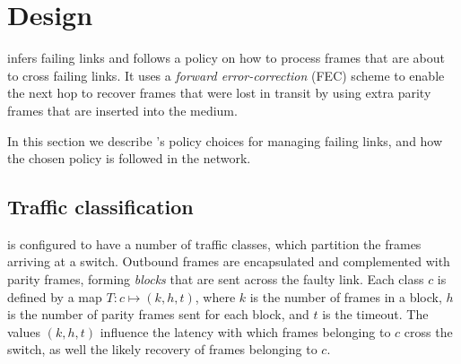 \section{Design}
\label{sec:design}

\OurSys infers failing links and follows a policy on how to process
frames that are about to cross failing links. It uses a \emph{forward
error-correction} (FEC) scheme to enable the next hop to recover frames that
were lost in transit by using extra parity frames that are inserted
into the medium.

In this section we describe \OurSys's policy choices for managing failing
links, and how the chosen policy is followed in the network.


\subsection{Traffic classification}
\label{sec:traffic-classification}
\OurSys is configured to have a number of traffic classes,
which partition%
 the frames arriving at a switch. Outbound frames are encapsulated and
complemented with parity frames, forming \emph{blocks} that are sent across
the faulty link.
Each class $c$ is defined by a map $T: c \mapsto (k, h, t)$, where $k$ is the
number of frames in a block, $h$ is the number of parity frames sent for each
block, and $t$ is the timeout.
The values $(k, h, t)$ influence the latency with which frames belonging to $c$
cross the switch, as well the likely recovery of frames belonging to $c$.


